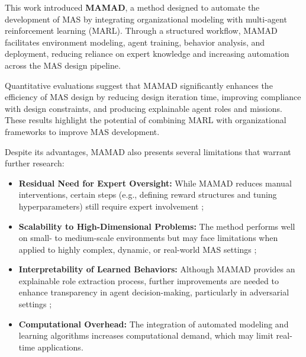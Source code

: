 \documentclass[pdflatex,sn-mathphys-num]{sn-jnl}%
\theoremstyle{thmstyleone}%
\theoremstyle{thmstyletwo}%
\theoremstyle{thmstylethree}%
\begin{document}
This work introduced \textbf{MAMAD}, a method designed to automate the development of MAS by integrating organizational modeling with multi-agent reinforcement learning (MARL). Through a structured workflow, MAMAD facilitates environment modeling, agent training, behavior analysis, and deployment, reducing reliance on expert knowledge and increasing automation across the MAS design pipeline. 

Quantitative evaluations suggest that MAMAD significantly enhances the efficiency of MAS design by reducing design iteration time, improving compliance with design constraints, and producing explainable agent roles and missions. These results highlight the potential of combining MARL with organizational frameworks to improve MAS development.


Despite its advantages, MAMAD also presents several limitations that warrant further research:
%
\begin{itemize}
    \item \textbf{Residual Need for Expert Oversight:} While MAMAD reduces manual interventions, certain steps (e.g., defining reward structures and tuning hyperparameters) still require expert involvement ;
    \item \textbf{Scalability to High-Dimensional Problems:} The method performs well on small- to medium-scale environments but may face limitations when applied to highly complex, dynamic, or real-world MAS settings ;
    \item \textbf{Interpretability of Learned Behaviors:} Although MAMAD provides an explainable role extraction process, further improvements are needed to enhance transparency in agent decision-making, particularly in adversarial settings ;
    \item \textbf{Computational Overhead:} The integration of automated modeling and learning algorithms increases computational demand, which may limit real-time applications.
\end{itemize}
\end{document}
